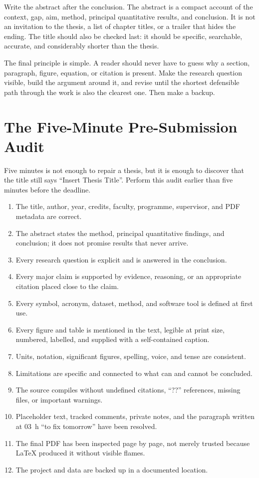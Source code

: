 \documentclass[masters,en,listoffigures,listoftables,acronyms]{NMBU}
\begin{document}
Write the abstract after the conclusion. The abstract is a compact account of
the context, gap, aim, method, principal quantitative results, and conclusion.
It is not an invitation to the thesis, a list of chapter titles, or a trailer
that hides the ending. The title should also be checked last: it should be
specific, searchable, accurate, and considerably shorter than the thesis.

The final principle is simple. A reader should never have to guess why a section,
paragraph, figure, equation, or citation is present. Make the research question
visible, build the argument around it, and revise until the shortest defensible
path through the work is also the clearest one. Then make a backup.

\clearpage
{}

\clearpage
\appendices

\section{The Five-Minute Pre-Submission Audit}
\label{app:audit}

Five minutes is not enough to repair a thesis, but it is enough to discover that
the title still says ``Insert Thesis Title''. Perform this audit earlier than
five minutes before the deadline.

\begin{enumerate}
  \item The title, author, year, credits, faculty, programme, supervisor, and PDF
  metadata are correct.
  \item The abstract states the method, principal quantitative findings, and
  conclusion; it does not promise results that never arrive.
  \item Every research question is explicit and is answered in the conclusion.
  \item Every major claim is supported by evidence, reasoning, or an appropriate
  citation placed close to the claim.
  \item Every symbol, acronym, dataset, method, and software tool is defined at
  first use.
  \item Every figure and table is mentioned in the text, legible at print size,
  numbered, labelled, and supplied with a self-contained caption.
  \item Units, notation, significant figures, spelling, voice, and tense are
  consistent.
  \item Limitations are specific and connected to what can and cannot be
  concluded.
  \item The source compiles without undefined citations, ``??'' references,
  missing files, or important warnings.
  \item Placeholder text, tracked comments, private notes, and the paragraph
  written at \qty{03}{h} ``to fix tomorrow'' have been resolved.
  \item The final PDF has been inspected page by page, not merely trusted because
  LaTeX produced it without visible flames.
  \item The project and data are backed up in a documented location.
\end{enumerate}
\end{document}
